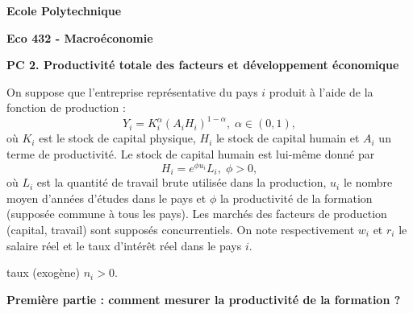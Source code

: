 \documentclass[a4paper,11pt]{article}
\begin{document}
\begin{center}
\textbf{Ecole Polytechnique}

\bigskip

\textbf{Eco 432 - Macro\'{e}conomie}

\bigskip

\textbf{PC 2. Productivité totale des facteurs et d\'{e}veloppement \'{e}conomique}
\end{center}

\bigskip

On suppose que l'entreprise repr\'{e}sentative du pays $i$ produit \`{a}
l'aide de la fonction de production : 
\begin{equation}
Y_{i}=K_{i}^{\alpha }(A_{i}H_{i})^{1-\alpha },\;\alpha \in (0,1),  \label{E1}
\end{equation}%
o\`{u} $K_{i}$ est le stock de capital physique, $H_{i}$ le stock de capital
humain et $A_{i}$ un terme de productivit\'{e}. Le stock de capital humain
est lui-m\^{e}me donn\'{e} par 
\begin{equation}
H_{i}=e^{\phi u_{i}}L_{i},\;\phi >0,  \label{E2}
\end{equation}%
o\`{u} $L_{i}$ est la quantit\'{e} de travail brute utilis\'{e}e dans la
production, $u_{i}$ le nombre moyen d'ann\'{e}es d'\'{e}tudes dans le pays
et $\phi $ la productivit\'{e} de la formation (suppos\'{e}e commune \`{a}
tous les pays).  Les march\'{e}s des facteurs de production
(capital, travail) sont suppos\'{e}s concurrentiels. On note respectivement $%
w_{i}$ et $r_{i}$ le salaire r\'{e}el et le taux d'int\'{e}r\^{e}t r\'{e}el
dans le pays $i$.

taux (exog\`{e}ne) $n_{i}>0$.

\bigskip

\noindent \textbf{Premi\`{e}re partie : comment mesurer la productivit\'{e}
de la formation ?}

\bigskip
\end{document}

